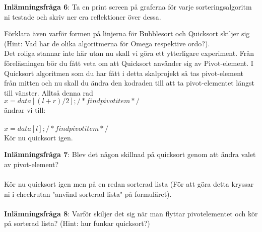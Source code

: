 \documentclass{article}
\begin{document}
\textbf{Inlämningsfråga 6}: Ta en print screen på graferna för varje sorteringsalgoritm ni testade  och skriv ner era reflektioner över dessa. 

Förklara även varför formen på linjerna för Bubblesort och Quicksort skiljer sig (Hint: Vad har de olika algoritmerna för Omega respektive ordo?). \\

Det roliga stannar inte här utan nu skall vi göra ett ytterligare experiment. Från föreläsningen bör du fått veta om att Quicksort använder sig av Pivot-element. I Quicksort algoritmen som du har fått i detta skalprojekt så tas pivot-element från mitten och nu skall du ändra den kodraden till att ta pivot-elementet längst till vänster. Alltså denna rad\\

$x = data[(l + r) / 2]; /* find pivot item */$ \\

ändrar vi till: \\\\
$x = data[l]; /* find pivot item */$ \\

Kör nu quicksort igen.%

\textbf{Inlämningsfråga 7}: Blev det någon skillnad på quicksort genom att ändra valet av pivot-element?  \\\\

Kör nu quicksort igen men på en redan sorterad lista (För att göra detta kryssar ni i checkrutan "använd sorterad lista" på formuläret).\\\\


\textbf{Inlämningsfråga 8}: Varför skiljer det sig när man flyttar pivotelementet och kör på sorterad lista? (Hint: hur funkar quicksort?)
\end{document}
